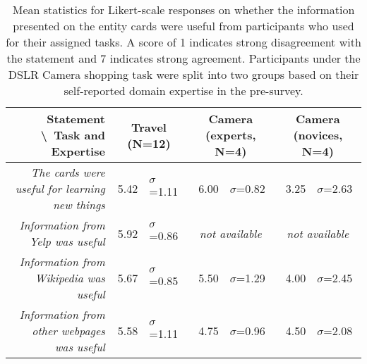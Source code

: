 \begin{table*}
  \centering
  \footnotesize
  \begin{tabular}{ r  r l   r l r l }
  
  \hline
	
	\multicolumn{1}{p{0.7\columnwidth}}{Statement \textbackslash~Task and Expertise} &
	\multicolumn{2}{c}{Travel {\tiny(N=12)}} &
	\multicolumn{2}{c}{Camera {\tiny(experts, N=4)}} &
	\multicolumn{2}{c}{Camera {\tiny(novices, N=4)}} \\
    
	\hline
	
    
	\multicolumn{1}{p{0.7\columnwidth}}{\textit{The cards were useful for learning new things}} &
    5.42 & $\sigma$=1.11 &
    6.00 & $\sigma$=0.82 &
    3.25 & $\sigma$=2.63 \\
    
	\multicolumn{1}{p{0.7\columnwidth}}{\textit{Information from Yelp was useful
}} &
    5.92 & $\sigma$=0.86 &
	\multicolumn{2}{c}{\emph{not available}} &
	\multicolumn{2}{c}{\emph{not available}} \\
    
	\multicolumn{1}{p{0.7\columnwidth}}{\textit{Information from Wikipedia was useful}} &
    5.67 & $\sigma$=0.85 &
    5.50 & $\sigma$=1.29 &
    4.00 & $\sigma$=2.45 \\
    
	\multicolumn{1}{p{0.7\columnwidth}}{\textit{Information from other webpages was useful}} &
    5.58 & $\sigma$=1.11 &
    4.75 & $\sigma$=0.96 &
    4.50 & $\sigma$=2.08 \\
    
	\hline
	
  \end{tabular}
  \caption{Mean statistics for Likert-scale responses on whether the information presented on the entity cards were useful from participants who used {\SYSTEM} for their assigned tasks. A score of 1 indicates strong disagreement with the statement and 7 indicates strong agreement. Participants under the DSLR Camera shopping task were split into two groups based on their self-reported domain expertise in the pre-survey.}
  \label{tab:results}
\end{table*}